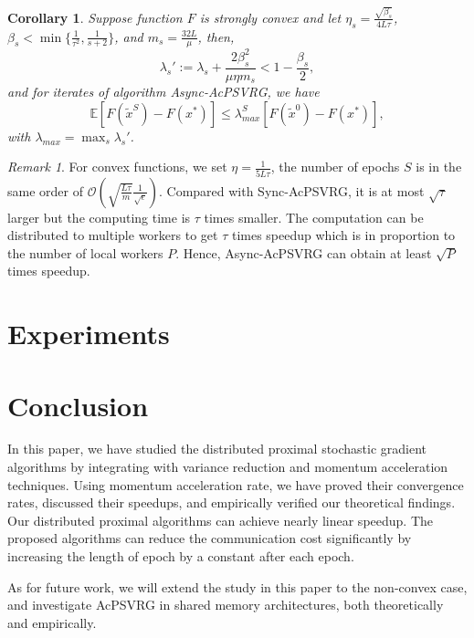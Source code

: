 \documentclass{article}
\newcommand*{\E}{\mathbb{E}}
\newtheorem{corollary}[theorem]{Corollary}
\theoremstyle{definition}
\theoremstyle{remark}
\newtheorem{remark}[theorem]{Remark}
\begin{document}
\begin{corollary}\label{cor-asyn}
Suppose function $F$ is strongly convex and 
let $\eta_s=\frac{\sqrt{\beta_s}}{4L\tau}$, $\beta_s< \min\{\frac{1}{\tau^2},\frac{1}{s+2}\}$, and $m_s=\frac{32L}{\mu}$, then, 
\[
\lambda_s' := \lambda_s+{\frac{2 \beta_s^2}{\mu\eta m_s}} < 1-\frac{\beta_s}{2},
\]
and for iterates of algorithm Async-AcPSVRG, we have
\begin{equation}
\E\left[F(\widetilde{x}^S)-F(x^*)\right]\leq \lambda_{max}^S\left[F(\widetilde{x}^0)-F(x^*)\right], 
\end{equation}
with $\lambda_{max} = \max_{s}{\lambda_s'}$. 
\end{corollary}
\begin{remark}
For convex functions, we set $\eta=\frac{1}{5L\tau}$, the number of epochs $S$ is in the same order of $\mathcal{O}(\sqrt{\frac{L\tau}{m}}\frac{1}{\sqrt{\epsilon}})$.
Compared with Sync-AcPSVRG, it
is at most $\sqrt{\tau}$ larger but the computing time is $\tau$ times smaller.
The computation can be distributed to multiple
workers to get $\tau$ times speedup which is in proportion to the number of local workers $P$. Hence, Async-AcPSVRG can
obtain at least $\sqrt{P}$ times speedup.
\end{remark}
\section{Experiments}
%
%

\section{Conclusion}
In this paper, we have studied the distributed proximal stochastic gradient algorithms by integrating with variance reduction and momentum acceleration techniques. Using momentum acceleration rate, we have proved their convergence rates, discussed their speedups, and empirically verified our theoretical findings. Our distributed proximal algorithms can achieve nearly linear speedup. The proposed algorithms can reduce the communication cost significantly by increasing the length of epoch by a constant after each epoch.

As for future work, we will extend the study in this paper to the non-convex case, and investigate AcPSVRG in shared memory architectures, both theoretically and empirically.

{\footnotesize


}
\end{document}
